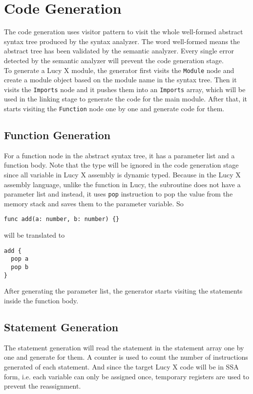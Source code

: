 \section{Code Generation}
The code generation uses visitor pattern to visit the whole well-formed abstract syntax tree produced by the syntax analyzer. The word well-formed means the abstract tree has been validated by the semantic analyzer. Every single error detected by the semantic analyzer will prevent the code generation stage. \\
To generate a Lucy X module, the generator first visits the \texttt{Module} node and create a module object based on the module name in the syntax tree. Then it visits the \texttt{Imports} node and it pushes them into an \texttt{Imports} array, which will be used in the linking stage to generate the code for the main module. After that, it starts visiting the \texttt{Function} node one by one and generate code for them. \\
\subsection{Function Generation}
For a function node in the abstract syntax tree, it has a parameter list and a function body. Note that the type will be ignored in the code generation stage since all variable in Lucy X assembly is dynamic typed. Because in the Lucy X assembly language, unlike the function in Lucy, the subroutine does not have a parameter list and instead, it uses \texttt{pop} instruction to pop the value from the memory stack and saves them to the parameter variable. So
\begin{lstlisting}
func add(a: number, b: number) {}
\end{lstlisting}
will be translated to
\begin{lstlisting}[language=LucyX]
add {
  pop a
  pop b
}
\end{lstlisting}
After generating the parameter list, the generator starts visiting the statements inside the function body.
\subsection{Statement Generation}
The statement generation will read the statement in the statement array one by one and generate for them. A counter is used to count the number of instructions generated of each statement. And since the target Lucy X code will be in SSA form, i.e. each variable can only be assigned once, temporary registers are used to prevent the reassignment.
